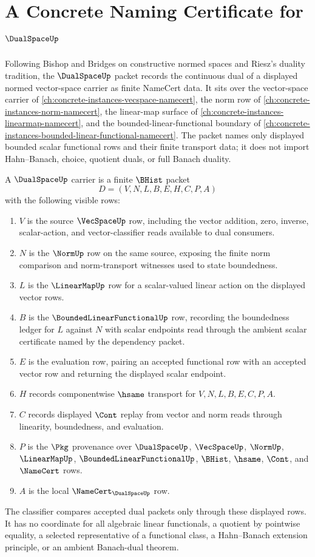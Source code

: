 \chapter{A Concrete Naming Certificate for $\DualSpaceUp$}
\label{ch:concrete-instances-dual-space-namecert}

Following Bishop and Bridges on constructive normed spaces and Riesz's duality tradition, the $\DualSpaceUp$ packet records the continuous dual of a displayed normed vector-space carrier as finite NameCert data. It sits over the vector-space carrier of \autoref{ch:concrete-instances-vecspace-namecert}, the norm row of \autoref{ch:concrete-instances-norm-namecert}, the linear-map surface of \autoref{ch:concrete-instances-linearmap-namecert}, and the bounded-linear-functional boundary of \autoref{ch:concrete-instances-bounded-linear-functional-namecert}. The packet names only displayed bounded scalar functional rows and their finite transport data; it does not import Hahn--Banach, choice, quotient duals, or full Banach duality.

\begin{definition}
\label{def:dual-space-carrier}
A $\DualSpaceUp$ carrier is a finite $\BHist$ packet
$$
D=(V,N,L,B,E,H,C,P,A)
$$
with the following visible rows:
\begin{enumerate}
\item $V$ is the source $\VecSpaceUp$ row, including the vector addition, zero, inverse, scalar-action, and vector-classifier reads available to dual consumers.
\item $N$ is the $\NormUp$ row on the same source, exposing the finite norm comparison and norm-transport witnesses used to state boundedness.
\item $L$ is the $\LinearMapUp$ row for a scalar-valued linear action on the displayed vector rows.
\item $B$ is the $\BoundedLinearFunctionalUp$ row, recording the boundedness ledger for $L$ against $N$ with scalar endpoints read through the ambient scalar certificate named by the dependency packet.
\item $E$ is the evaluation row, pairing an accepted functional row with an accepted vector row and returning the displayed scalar endpoint.
\item $H$ records componentwise $\hsame$ transport for $V,N,L,B,E,C,P,A$.
\item $C$ records displayed $\Cont$ replay from vector and norm reads through linearity, boundedness, and evaluation.
\item $P$ is the $\Pkg$ provenance over $\DualSpaceUp$, $\VecSpaceUp$, $\NormUp$, $\LinearMapUp$, $\BoundedLinearFunctionalUp$, $\BHist$, $\hsame$, $\Cont$, and $\NameCert$ rows.
\item $A$ is the local $\NameCert_{\DualSpaceUp}$ row.
\end{enumerate}
The classifier compares accepted dual packets only through these displayed rows. It has no coordinate for all algebraic linear functionals, a quotient by pointwise equality, a selected representative of a functional class, a Hahn--Banach extension principle, or an ambient Banach-dual theorem.
\end{definition}

